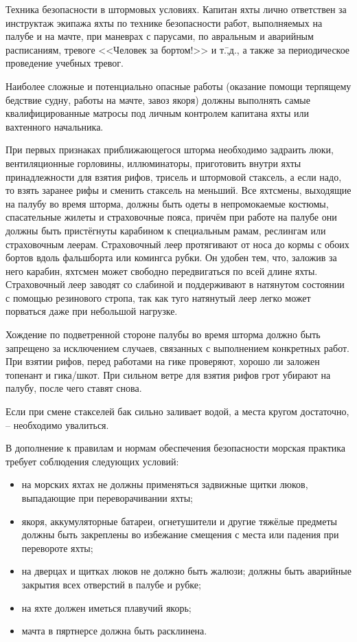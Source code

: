 Техника безопасности в штормовых условиях. Капитан яхты лично ответствен за инструктаж экипажа яхты по технике безопасности работ, выполняемых на палубе и на мачте, при маневрах с парусами, по авральным и аварийным расписаниям, тревоге <<Человек за бортом!>> и т.\=,д., а также за периодическое проведение учебных тревог. 

Наиболее сложные и потенциально опасные работы (оказание помощи терпящему бедствие судну, работы на мачте, завоз якоря) должны выполнять самые квалифицированные матросы под личным контролем капитана яхты или вахтенного начальника.

При первых признаках приближающегося шторма необходимо задраить люки, вентиляционные горловины, иллюминаторы, приготовить внутри яхты принадлежности для взятия рифов, трисель и штормовой стаксель, а если надо, то взять заранее рифы и сменить стаксель на меньший. Все яхтсмены, выходящие на палубу во время шторма, должны быть одеты в непромокаемые костюмы, спасательные жилеты и страховочные пояса, причём при работе на палубе они должны быть пристёгнуты карабином к специальным рамам, реслингам или страховочным леерам. Страховочный леер протягивают от носа до кормы с обоих бортов вдоль фальшборта или комингса рубки. Он удобен тем, что, заложив за него карабин, яхтсмен может свободно передвигаться по всей длине яхты. Страховочный леер заводят со слабиной и поддерживают в натянутом состоянии с помощью резинового стропа, так как туго натянутый леер легко может порваться даже при небольшой нагрузке.

Хождение по подветренной стороне палубы во время шторма должно быть запрещено за исключением случаев, связанных с выполнением конкретных работ. При взятии рифов, перед работами на гике проверяют, хорошо ли заложен топенант и гика\-/шкот. При сильном ветре для взятия рифов грот убирают на палубу, после чего ставят снова.

Если при смене стакселей бак сильно заливает водой, а места кругом достаточно, \--- необходимо увалиться. 

В дополнение к правилам и нормам обеспечения безопасности морская практика требует соблюдения следующих условий:
\begin{itemize}
\item на морских яхтах не должны применяться задвижные щитки люков, выпадающие при переворачивании яхты; 
\item якоря, аккумуляторные батареи, огнетушители и другие тяжёлые предметы должны быть закреплены во избежание смещения с места или падения при перевороте яхты; 
\item на дверцах и щитках люков не должно быть жалюзи; должны быть аварийные закрытия всех отверстий в палубе и рубке; 
\item на яхте должен иметься плавучий якорь; 
\item мачта в пяртнерсе должна быть расклинена. 
\end{itemize}

